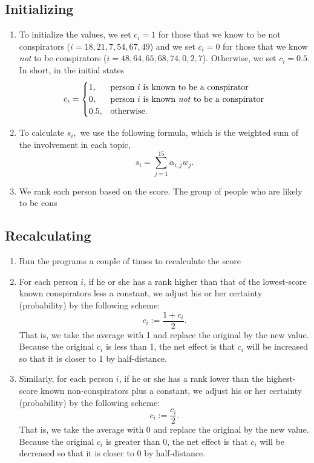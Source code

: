 \documentclass{icmmcm}
\begin{document}
\subsection{Initializing}
\begin{enumerate}
\item To initialize the values, we set $c_i = 1$ for those that
we know to be not conspirators ($i=18,21,7,54,67,49$)
and we set $c_i = 0$ for those that
we know \textit{not} to be conspirators ($i=48,64,65,68,74,0,2,7$).
Otherwise, we set $c_i = 0.5.$ In short, in the initial states
\[c_i=
\begin{cases}
1,	& \text{person $i$ is known to be a conspirator}\\
0,	& \text{person $i$ is known \textit{not} to be a conspirator}\\
0.5,	&\text{otherwise.}
\end{cases}\]

\item To calculate $s_i,$ we use the following formula,
which is the weighted sum of the involvement in each topic,
\[s_i = \sum_{j=1}^{15} \alpha_{i,j} w_j.\]

\item We rank each person based on the score.
The group of people who are likely to be 
cons
\end{enumerate}

\subsection{Recalculating}
\begin{enumerate}

\item Run the programs a couple of times to recalculate
the score 

\item For each person $i$,
if he or she has a 
rank higher than that of the lowest-score known conspirators less a constant,
we adjust his or her certainty (probability) by the following scheme:
\[c_i := \frac{1 + c_i}{2}.\]
That is, we take the average with 1 and replace the original by the new value. 
Because the original $c_i$ is less than 1, the net effect is that
$c_i$ will be increased so that it is closer to 1 by half-distance.

\item Similarly,
for each person $i$,
if he or she has a 
rank lower than the highest-score known non-conspirators plus a constant,
we adjust his or her certainty (probability) by the following scheme:
\[c_i := \frac{c_i}{2}.\]
That is, we take the average with 0 and replace the original by the new value. 
Because the original $c_i$ is greater than 0, the net effect is that
$c_i$ will be decreased so that it is closer to 0 by half-distance.

\end{enumerate}
\end{document}
